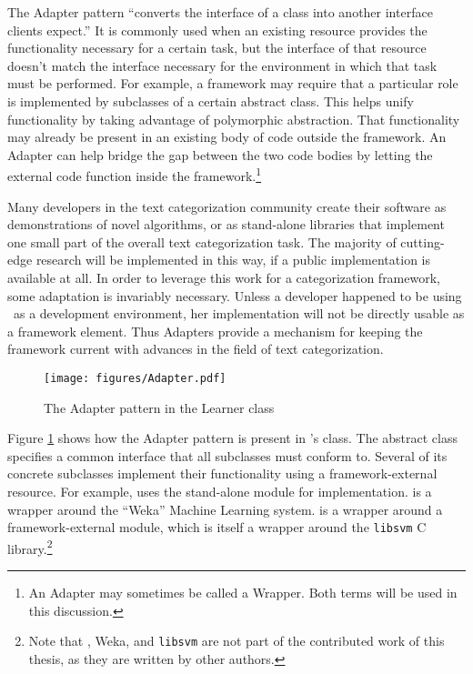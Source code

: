 The Adapter pattern ``converts the interface of a class into another
interface clients expect.'' \cite[p. 139]{gamma:95} It is commonly
used when an existing resource provides the functionality necessary
for a certain task, but the interface of that resource doesn't match
the interface necessary for the environment in which that task must be
performed.  For example, a framework may require that a particular
role is implemented by subclasses of a certain abstract class.  This
helps unify functionality by taking advantage of polymorphic
abstraction. \cite[p. 5]{fayad:99} That functionality may already be
present in an existing body of code outside the framework.  An Adapter
can help bridge the gap between the two code bodies by letting the
external code function inside the framework.\footnote{An Adapter may
sometimes be called a Wrapper.  Both terms will be used in this
discussion.}

Many developers in the text categorization community create their
software as demonstrations of novel algorithms, or as stand-alone
libraries that implement one small part of the overall text
categorization task.  The majority of cutting-edge research will be
implemented in this way, if a public implementation is available at
all.  In order to leverage this work for a categorization framework,
some adaptation is invariably necessary.  Unless a developer happened
to be using \aicat\ as a development environment, her implementation
will not be directly usable as a framework element.  Thus Adapters
provide a mechanism for keeping the framework current with advances in
the field of text categorization.

\begin{figure}
\texttt{[image: figures/Adapter.pdf]}
\caption{The Adapter pattern in the Learner class}
\label{Adapter-learner}
\end{figure}

Figure \ref{Adapter-learner} shows how the Adapter
pattern is present in \aicat's  class.  The abstract
 class specifies a common interface that all subclasses
must conform to.  Several of its concrete subclasses implement their
functionality using a framework-external resource.  For example,
 uses the stand-alone module
 for implementation.  
is a wrapper around the ``Weka'' Machine Learning system.
 is a wrapper around a framework-external
 module, which is itself a wrapper around the
\texttt{libsvm}\cite{libsvm} C library.\footnote{Note that
, Weka, and \texttt{libsvm} are not part of the
contributed work of this thesis, as they are written by other authors.}

